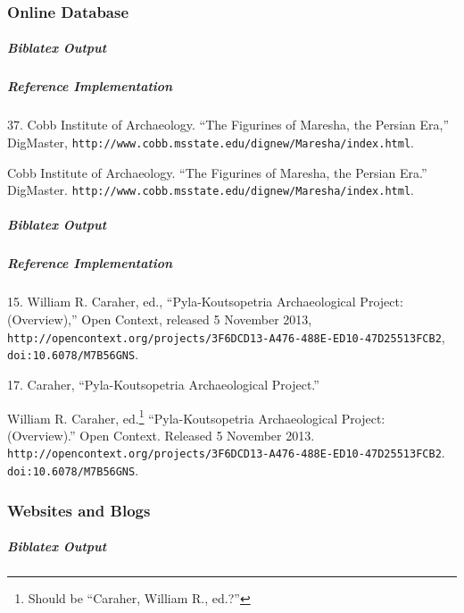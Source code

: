 \documentclass[a4paper]{article}
\newenvironment{biboutput}{%
  \subparagraph{Biblatex Output}
}{\color{black}}
\newenvironment{refimp}{%
  \subparagraph{Reference Implementation}
  \color{reference-colour}
  \rm
}{\par\color{black}}
\begin{document}
\subsubsection{Online Database}

\begin{biboutput}
\end{biboutput}

\begin{refimp}
  \hspace*{\bibindent}37. Cobb Institute of Archaeology. “The Figurines of
  Maresha, the Persian Era,” DigMaster,
  \nolinkurl{http://www.cobb.msstate.edu/dignew/Maresha/index.html}.

  \hangindent\bibindent Cobb Institute of Archaeology. “The Figurines of
  Maresha, the Persian Era.” DigMaster.
  \nolinkurl{http://www.cobb.msstate.edu/dignew/Maresha/index.html}.
\end{refimp}

\begin{biboutput}
\end{biboutput}

\begin{refimp}
  \hspace*{\bibindent}15. William R. Caraher, ed., “Pyla-Koutsopetria
  Archaeological Project: (Overview),” Open Context, released 5 November 2013,
  \nolinkurl{http://opencontext.org/projects/3F6DCD13-A476-488E-ED10-47D25513FCB2},
  \nolinkurl{doi:10.6078/M7B56GNS}.

  \hspace*{\bibindent}17. Caraher, “Pyla-Koutsopetria Archaeological Project.”

  \hangindent\bibindent William R. Caraher, ed.\footnote{Should be “Caraher,
  William R., ed.?”} “Pyla-Koutsopetria Archaeological Project: (Overview).”
  Open Context. Released 5 November 2013.
  \nolinkurl{http://opencontext.org/projects/3F6DCD13-A476-488E-ED10-47D25513FCB2}.
  \nolinkurl{doi:10.6078/M7B56GNS}.\sloppy
\end{refimp}

\subsubsection{Websites and Blogs}

\begin{biboutput}
\end{biboutput}
\end{document}
